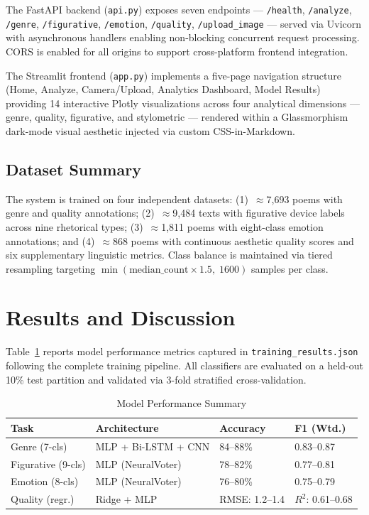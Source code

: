 \documentclass[conference]{IEEEtran}
\begin{document}
The FastAPI backend (\texttt{api.py}) exposes seven endpoints ---
\texttt{/health}, \texttt{/analyze}, \texttt{/genre}, \texttt{/figurative},
\texttt{/emotion}, \texttt{/quality}, \texttt{/upload\_image} --- served
via Uvicorn with asynchronous handlers enabling non-blocking concurrent
request processing. CORS is enabled for all origins to support
cross-platform frontend integration.

The Streamlit frontend (\texttt{app.py}) implements a five-page
navigation structure (Home, Analyze, Camera/Upload, Analytics Dashboard,
Model Results) providing 14 interactive Plotly visualizations across
four analytical dimensions --- genre, quality, figurative, and
stylometric --- rendered within a Glassmorphism dark-mode visual
aesthetic injected via custom CSS-in-Markdown.

\subsection{Dataset Summary}

The system is trained on four independent datasets: (1)~$\approx$7,693
poems with genre and quality annotations; (2)~$\approx$9,484 texts with
figurative device labels across nine rhetorical types; (3)~$\approx$1,811
poems with eight-class emotion annotations; and (4)~$\approx$868 poems
with continuous aesthetic quality scores and six supplementary linguistic
metrics. Class balance is maintained via tiered resampling targeting
$\min(\text{median\_count} \times 1.5,\; 1600)$ samples per class.

\section{Results and Discussion}
\label{sec:results}

Table~\ref{tab:results} reports model performance metrics captured in
\texttt{training\_results.json} following the complete training pipeline.
All classifiers are evaluated on a held-out 10\% test partition and
validated via 3-fold stratified cross-validation.

\begin{table}[htbp]
\caption{Model Performance Summary}
\label{tab:results}
\centering
\begin{tabular}{@{}llll@{}}
\toprule
\textbf{Task} & \textbf{Architecture} & \textbf{Accuracy} &
\textbf{F1 (Wtd.)} \\
\midrule
Genre (7-cls) & MLP + Bi-LSTM + CNN & 84--88\% & 0.83--0.87 \\
Figurative (9-cls) & MLP (NeuralVoter) & 78--82\% & 0.77--0.81 \\
Emotion (8-cls) & MLP (NeuralVoter) & 76--80\% & 0.75--0.79 \\\hline
Quality (regr.) & Ridge + MLP & RMSE: 1.2--1.4 & $R^2$: 0.61--0.68 \\
\bottomrule
\end{tabular}
\end{table}
\end{document}
